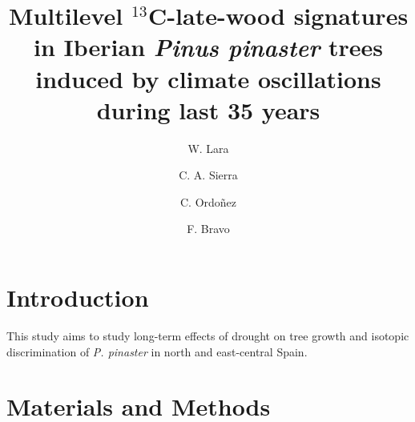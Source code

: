 \documentclass[review,authoryear]{elsarticle}
\begin{document}
\begin{frontmatter}
\title{\textbf{Multilevel $^{13}$C-late-wood signatures in Iberian \textit{Pinus pinaster} trees induced by climate oscillations during last 35 years }}

\author[aut1,aut2]{W. Lara}
\author[aut1]{C. A.  Sierra }
\author[aut1]{C. Ordo{\~n}ez}
\author[aut1]{F. Bravo}


\address[aut1]{Sustainable Forest Management Research
  Institute,UVA-INIA, Avenida Madrid, s/n, 34071, Palencia, Spain}

\address[focal]{Department of Biogeochemical Processes, Max Planck
  Institute for Biogeochemistry, Hans-Kn\"oll-Stra\ss e 10, 07745,
  Jena, Germany}

\address[aut2]{Research Center on Ecosystems and Global Change,
  Carbono \& Bosques $($C\&B$)$, Calle 51A, N$^o$ 72-23, Int: 601,
  050034, Medell{\'i}n, Colombia}

\begin{abstract}
\end{abstract}
\begin{keyword}
\end{keyword}
\end{frontmatter}

\linenumbers
\section{Introduction}\label{sec:intro}

This study aims to study long-term effects of drought on tree growth
and isotopic discrimination of \textit{P. pinaster} in north and
east-central Spain.



\section{Materials and Methods}
\end{document}
